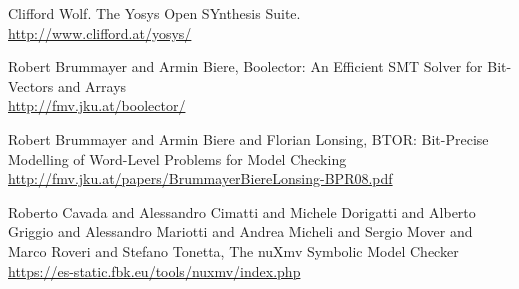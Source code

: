 \documentclass[9pt,technote,a4paper]{IEEEtran}
\begin{document}
\begin{thebibliography}{9}

Clifford Wolf. The Yosys Open SYnthesis Suite. \\
\url{http://www.clifford.at/yosys/}





Robert Brummayer and Armin Biere, Boolector: An Efficient SMT Solver for Bit-Vectors and Arrays\\
\url{http://fmv.jku.at/boolector/}

Robert Brummayer and Armin Biere and Florian Lonsing, BTOR:
Bit-Precise Modelling of Word-Level Problems for Model Checking\\
\url{http://fmv.jku.at/papers/BrummayerBiereLonsing-BPR08.pdf}

Roberto Cavada and Alessandro Cimatti and Michele Dorigatti and
Alberto Griggio and Alessandro Mariotti and Andrea Micheli and Sergio
Mover and Marco Roveri and Stefano Tonetta, The nuXmv Symbolic Model
Checker\\
\url{https://es-static.fbk.eu/tools/nuxmv/index.php}

\end{thebibliography}
\end{document}
